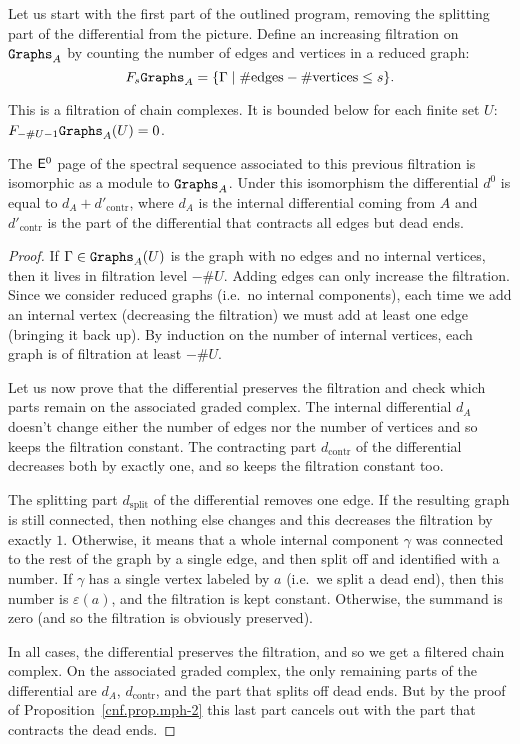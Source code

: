 Let us start with the first part of the outlined program, removing the splitting part of the differential from the picture.
Define an increasing filtration on $\mathtt{Graphs}_{A}$ by counting the number of edges and vertices in a reduced graph:
\[ F_{s} \mathtt{Graphs}_{A} = \{ \Gamma \mid \# \text{edges} - \# \text{vertices} \leq s \}. \]

\begin{lemma}
  This is a filtration of chain complexes.
  It is bounded below for each finite set $U$: $F_{-\#U-1} \mathtt{Graphs}_{A}(U) = 0$.

    The $\mathsf{E}^{0}$ page of the spectral sequence associated to this previous filtration is isomorphic as a module to $\mathtt{Graphs}_{A}$.
  Under this isomorphism the differential $d^{0}$ is equal to $d_{A} + d'_{\mathrm{contr}}$, where $d_{A}$ is the internal differential coming from $A$ and $d'_{\mathrm{contr}}$ is the part of the differential that contracts all edges but dead ends.
\end{lemma}
\begin{proof}
  If $\Gamma \in \mathtt{Graphs}_{A}(U)$ is the graph with no edges and no internal vertices, then it lives in filtration level $-\#U$. Adding edges can only increase the filtration. Since we consider reduced graphs (i.e.\ no internal components), each time we add an internal vertex (decreasing the filtration) we must add at least one edge (bringing it back up). By induction on the number of internal vertices, each graph is of filtration at least $-\#U$.

  Let us now prove that the differential preserves the filtration and check which parts remain on the associated graded complex.
  The internal differential $d_{A}$ doesn't change either the number of edges nor the number of vertices and so keeps the filtration constant.
  The contracting part $d_{\mathrm{contr}}$ of the differential decreases both by exactly one, and so keeps the filtration constant too.

  The splitting part $d_{\mathrm{split}}$ of the differential removes one edge.
  If the resulting graph is still connected, then nothing else changes and this decreases the filtration by exactly $1$.
  Otherwise, it means that a whole internal component $\gamma$ was connected to the rest of the graph by a single edge, and then split off and identified with a number.
  If $\gamma$ has a single vertex labeled by $a$ (i.e.\ we split a dead end), then this number is $\varepsilon(a)$, and the filtration is kept constant.
  Otherwise, the summand is zero (and so the filtration is obviously preserved).

  In all cases, the differential preserves the filtration, and so we get a filtered chain complex.
  On the associated graded complex, the only remaining parts of the differential are $d_{A}$, $d_{\mathrm{contr}}$, and the part that splits off dead ends.
  But by the proof of Proposition~\ref{cnf.prop.mph-2} this last part cancels out with the part that contracts the dead ends.
\end{proof}

